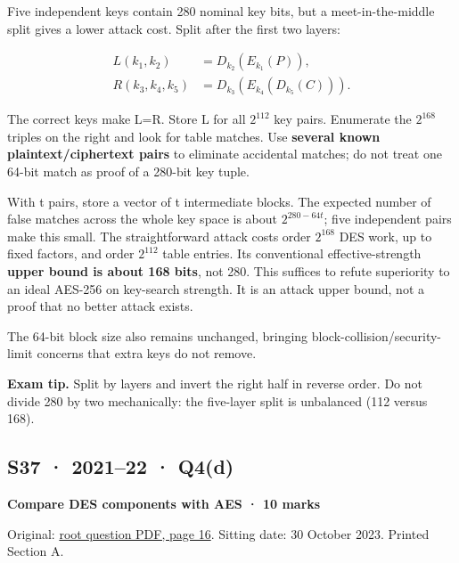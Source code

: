 \documentclass[11pt,a4paper]{article}
\begin{document}
Five independent keys contain 280 nominal key bits,\allowbreak{} but a meet-in-the-middle split gives a lower attack cost. Split after the first two layers:



\[
\begin{aligned}L(k_1,k_2)&=D_{k_2}(E_{k_1}(P)),\\R(k_3,k_4,k_5)&=D_{k_3}(E_{k_4}(D_{k_5}(C))).\end{aligned}
\]

The correct keys make L=\allowbreak{}R. Store L for all \(2^{112}\) key pairs. Enumerate the \(2^{168}\) triples on the right and look for table matches. Use \textbf{several known plaintext/\allowbreak{}ciphertext pairs} to eliminate accidental matches; do not treat one 64-bit match as proof of a 280-bit key tuple.


With t pairs,\allowbreak{} store a vector of t intermediate blocks. The expected number of false matches across the whole key space is about \(2^{280-64t}\); five independent pairs make this small. The straightforward attack costs order \(2^{168}\) DES work,\allowbreak{} up to fixed factors,\allowbreak{} and order \(2^{112}\) table entries. Its conventional effective-strength \textbf{upper bound is about 168 bits},\allowbreak{} not 280. This suffices to refute superiority to an ideal AES-256 on key-search strength. It is an attack upper bound,\allowbreak{} not a proof that no better attack exists.


The 64-bit block size also remains unchanged,\allowbreak{} bringing block-collision/\allowbreak{}security-limit concerns that extra keys do not remove.



{\color{ForestGreen}\textbf{Exam tip.} Split by layers and invert the right half in reverse order. Do not divide 280 by two mechanically: the five-layer split is unbalanced (112 versus 168).}




\clearpage
\subsection{S37 · 2021–22 · Q4(d)}\label{s37}

\textbf{Compare DES components with AES · 10 marks}


Original: \href{../../CSE405-Security_Merged.pdf\#page=16}{root question PDF,\allowbreak{} page 16}. Sitting date: 30 October 2023. Printed Section A.
\end{document}
